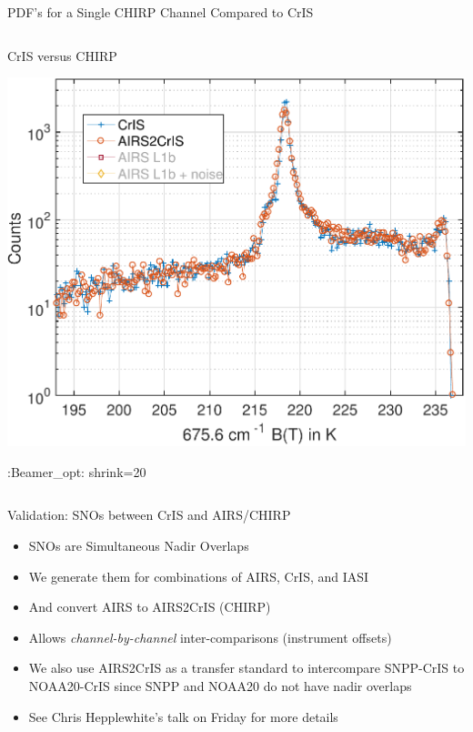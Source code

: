 \documentclass[10pt,t]{beamer}
\begin{document}
\begin{frame}[label={sec:org3f462d9}]{PDF's for a Single CHIRP Channel Compared to CrIS}
\begin{columns}
\begin{column}{0.55\columnwidth}
\begin{block}{\footnotesize CrIS versus CHIRP}
\vspace{-0.05in}
\vspace{-0.05in}
\begin{center}
\includegraphics[width=0.77\linewidth]{./Figs/Pdf/jun4_2015_airs_675wn_global_counts_w_airsnoise_and_cris_a2c_no_airs.pdf}
\end{center}

:Beamer\_opt: shrink=20
\end{block}
\end{column}
\end{columns}
\end{frame}
\begin{frame}[label={sec:orgf9048bc}]{Validation: SNOs between CrIS and AIRS/CHIRP}
\begin{itemize}
\item SNOs are Simultaneous Nadir Overlaps
\item We generate them for combinations of AIRS, CrIS, and IASI
\item And convert AIRS to AIRS2CrIS (CHIRP)
\item Allows \emph{channel-by-channel} inter-comparisons (instrument offsets)
\item We also use AIRS2CrIS as a transfer standard to intercompare SNPP-CrIS to NOAA20-CrIS since SNPP and NOAA20 do not have nadir overlaps
\item See Chris Hepplewhite's talk on Friday for more details
\end{itemize}
\end{frame}
\end{document}
